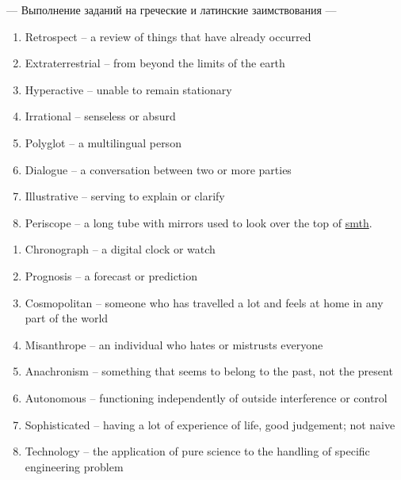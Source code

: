 \documentclass[main.tex]{subfiles}
\begin{document}


--- Выполнение заданий на греческие и латинские заимствования ---
\vspace{7pt}


\begin{enumerate}[nosep]
	\itemsep\eitsp
	\item Retrospect -- a review of things that have already occurred
	\item Extraterrestrial -- from beyond the limits of the earth
	\item Hyperactive -- unable to remain stationary
	\item Irrational -- senseless or absurd
	\item Polyglot -- a multilingual person
	\item Dialogue -- a conversation between two or more parties
	\item Illustrative -- serving to explain or clarify
	\item Periscope -- a long tube with mirrors used to look over the top of \uline{smth}.
\end{enumerate}
\vspace{5pt}


\begin{enumerate}[nosep]
	\itemsep\eitsp
	\item Chronograph -- a digital clock or watch
	\item Prognosis -- a forecast or prediction
	\item Cosmopolitan -- someone who has travelled a lot and feels at home in any part of the world
	\item Misanthrope -- an individual who hates or mistrusts everyone
	\item Anachronism -- something that seems to belong to the past, not the present
	\item Autonomous -- functioning independently of outside interference or control
	\item Sophisticated -- having a lot of experience of life, good judgement; not naive
	\item Technology -- the application of pure science to the handling of specific engineering problem
\end{enumerate}
\vspace{7pt}
\end{document}
